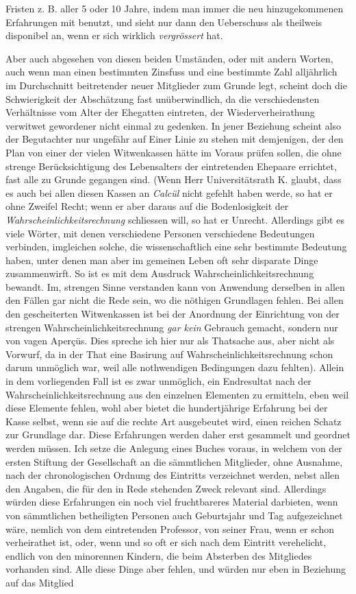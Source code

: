 Fristen z. B. aller 5 oder 10 Jahre, indem man immer die neu hinzugekommenen Erfahrungen mit benutzt, und sieht nur dann den Ueberschuss als theilweis disponibel an, wenn er sich wirklich \textit{vergrössert} hat.

Aber auch abgesehen von diesen beiden Umständen, oder mit andern Worten, auch wenn man einen bestimmten Zinsfuss und eine bestimmte Zahl alljährlich im Durchschnitt beitretender neuer Mitglieder zum Grunde legt, scheint doch die Schwierigkeit der Abschätzung fast unüberwindlich, da die verschiedensten Verhältnisse vom Alter der Ehegatten eintreten, der Wiederverheirathung verwitwet gewordener nicht einmal zu gedenken. In jener Beziehung scheint also der Begutachter nur ungefähr auf Einer Linie zu stehen mit demjenigen, der den Plan von einer der vielen Witwenkassen hätte im Voraus prüfen sollen, die ohne strenge Berücksichtigung des Lebensalters der eintretenden Ehepaare errichtet, fast alle zu Grunde gegangen sind. (Wenn Herr Universitätsrath K. glaubt, dass es auch bei allen diesen Kassen an \textit{Calcül} nicht gefehlt haben werde, so hat er ohne Zweifel Recht; wenn er aber daraus auf die Bodenlosigkeit der \textit{Wahrscheinlichkeitsrechnung} schliessen will, so hat er Unrecht. Allerdings gibt es viele Wörter, mit denen verschiedene Personen verschiedene Bedeutungen verbinden, imgleichen solche, die wissenschaftlich eine sehr bestimmte Bedeutung haben, unter denen man aber im gemeinen Leben oft sehr disparate Dinge zusammenwirft. So ist es mit dem Ausdruck Wahrscheinlichkeitsrechnung bewandt. Im, strengen Sinne verstanden kann von Anwendung derselben in allen den Fällen gar nicht die Rede sein, wo die nöthigen Grundlagen fehlen. Bei allen den gescheiterten Witwenkassen ist bei der Anordnung der Einrichtung von der strengen Wahrscheinlichkeitsrechnung \textit{gar kein} Gebrauch gemacht, sondern nur von vagen Aperçüs. Dies spreche ich hier nur als Thatsache aus, aber nicht als Vorwurf, da in der That eine Basirung auf Wahrscheinlichkeitsrechnung schon darum unmöglich war, weil alle nothwendigen Bedingungen dazu fehlten). Allein in dem vorliegenden Fall ist es zwar unmöglich, ein Endresultat nach der Wahrscheinlichkeitsrechnung aus den einzelnen Elementen zu ermitteln, eben weil diese Elemente fehlen, wohl aber bietet die hundertjährige Erfahrung bei der Kasse selbst, wenn sie auf die rechte Art ausgebeutet wird, einen reichen Schatz zur Grundlage dar. Diese Erfahrungen werden daher erst gesammelt und geordnet werden müssen. Ich setze die Anlegung eines Buches voraus, in welchem von der ersten Stiftung der Gesellschaft an die sämmtlichen Mitglieder, ohne Ausnahme, nach der chronologischen Ordnung des Eintritts verzeichnet werden, nebst allen den Angaben, die für den in Rede stehenden Zweck relevant sind. Allerdings würden diese Erfahrungen ein noch viel fruchtbareres Material darbieten, wenn von sämmtlichen betheiligten Personen auch Geburtsjahr und Tag aufgezeichnet wäre, nemlich von dem eintretenden Professor, von seiner Frau, wenn er schon verheirathet ist, oder, wenn und so oft er sich nach dem Eintritt verehelicht, endlich von den minorennen Kindern, die beim Absterben des Mitgliedes vorhanden sind. Alle diese Dinge aber fehlen, und würden nur eben in Beziehung auf das Mitglied 